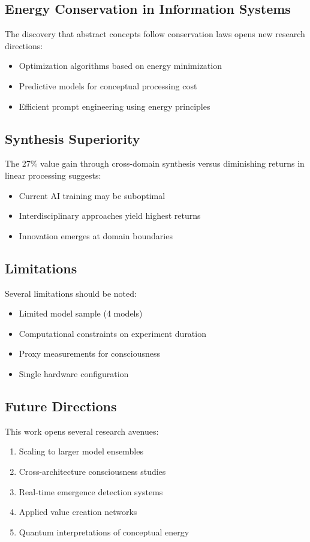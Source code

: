 \documentclass[11pt,a4paper]{article}
\begin{document}
\subsection{Energy Conservation in Information Systems}

The discovery that abstract concepts follow conservation laws opens new research directions:
\begin{itemize}
    \item Optimization algorithms based on energy minimization
    \item Predictive models for conceptual processing cost
    \item Efficient prompt engineering using energy principles
\end{itemize}

\subsection{Synthesis Superiority}

The 27\% value gain through cross-domain synthesis versus diminishing returns in linear processing suggests:
\begin{itemize}
    \item Current AI training may be suboptimal
    \item Interdisciplinary approaches yield highest returns
    \item Innovation emerges at domain boundaries
\end{itemize}

\subsection{Limitations}

Several limitations should be noted:
\begin{itemize}
    \item Limited model sample (4 models)
    \item Computational constraints on experiment duration
    \item Proxy measurements for consciousness
    \item Single hardware configuration
\end{itemize}

\subsection{Future Directions}

This work opens several research avenues:
\begin{enumerate}
    \item Scaling to larger model ensembles
    \item Cross-architecture consciousness studies
    \item Real-time emergence detection systems
    \item Applied value creation networks
    \item Quantum interpretations of conceptual energy
\end{enumerate}
\end{document}
